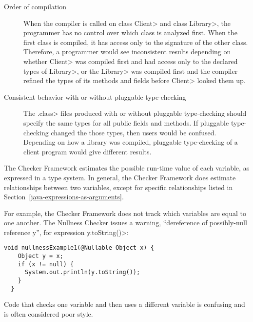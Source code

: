 \begin{description}
\item[Order of compilation]
  When the compiler is called on class \<Client> and class \<Library>, the
  programmer has no control over which class is analyzed first.  When the
  first class is compiled, it has access only to the signature of the other
  class.  Therefore, a programmer would see inconsistent results depending
  on whether \<Client> was compiled first and had access only to the
  declared types of \<Library>, or the \<Library> was compiled first and
  the compiler refined the types of its methods and fields before \<Client>
  looked them up.

\item[Consistent behavior with or without pluggable type-checking]
  The \<.class> files produced with or without pluggable type-checking
  should specify the same types for all public fields and methods.  If
  pluggable type-checking changed the those types, then users would be
  confused.  Depending on how a library was compiled, pluggable
  type-checking of a client program would give different results.

\end{description}




The Checker Framework estimates the possible run-time value of each
variable, as expressed in a type system.  In general, the Checker Framework
does estimate relationships between two variables, except for specific
relationships listed in Section~\ref{java-expressions-as-arguments}.

For example, the Checker Framework does not track which variables are equal
to one another.  The Nullness Checker issues a warning, ``dereference of
possibly-null reference y'', for expression \<y.toString()>:

\begin{Verbatim}
void nullnessExample1(@Nullable Object x) {
    Object y = x;
    if (x != null) {
      System.out.println(y.toString());
    }
  }
\end{Verbatim}

\noindent
Code that checks one variable and then uses a different variable is
confusing and is often considered poor style.

